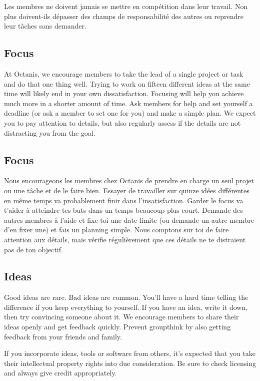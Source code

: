 	Les membres ne doivent jamais se mettre en compétition dans leur travail. Non plus doivent-ils dépasser des champs de responsabilité des autres ou reprendre leur tâches sans demander.


	
\english
	\subsection{Focus}
	At Octanis, we encourage members to take the lead of a single project or task and do that one thing well. Trying to work on fifteen different ideas at the same time will likely end in your own dissatisfaction. Focusing will help you achieve much more in a shorter amount of time. Ask members for help and set yourself a deadline (or ask a member to set one for you) and make a simple plan.
	We expect you to pay attention to details, but also regularly assess if the details are not distracting you from the goal.




\french
	\subsection{Focus}
	Nous encourageons les membres chez Octanis de prendre en charge un seul projet ou une tâche et de le faire bien. Essayer de travailler sur quinze idées différentes en même temps va probablement finir dans l'insatisfaction. Garder le focus va t'aider à atteindre tes buts dans un temps beaucoup plus court. Demande des autres membres à l'aide et fixe-toi une date limite (ou demande un autre membre d'en fixer une) et fais un planning simple. 
	Nous comptons sur toi de faire attention aux détails, mais vérifie régulièrement que ces détails ne te distraient pas de ton objectif. 
	

\english
	\subsection{Ideas}
	Good ideas are rare. Bad ideas are common. You'll have a hard time telling the difference if you keep everything to yourself.
	If you have an idea, write it down, then try convincing someone about it. We encourage members to share their ideas openly and get feedback quickly. Prevent groupthink by also getting feedback from your friends and family.

	If you incorporate ideas, tools or software from others, it's expected that you take their intellectual property rights into due consideration. Be sure to check licensing and always give credit appropriately.

